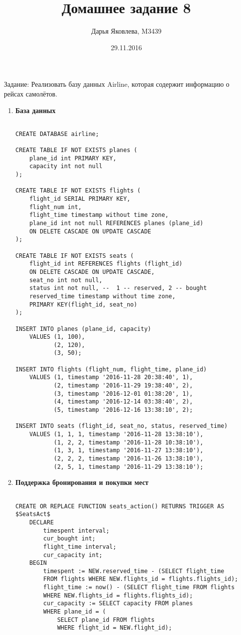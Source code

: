 \documentclass[12pt]{article}
\title{Домашнее задание 8}
\author{Дарья Яковлева, M3439}
\date{29.11.2016}
\begin{document}
\maketitle
\thispagestyle{empty}

Задание: Реализовать базу данных Airline, которая содержит информацию о рейсах самолётов.

\begin{enumerate}	
 \item \textbf{База данных}
 
\begin{lstlisting}     

CREATE DATABASE airline;

CREATE TABLE IF NOT EXISTS planes (
	plane_id int PRIMARY KEY,
	capacity int not null
);

CREATE TABLE IF NOT EXISTS flights (
	flight_id SERIAL PRIMARY KEY,
	flight_num int,
	flight_time timestamp without time zone,
	plane_id int not null REFERENCES planes (plane_id) 
	ON DELETE CASCADE ON UPDATE CASCADE
);

CREATE TABLE IF NOT EXISTS seats (
	flight_id int REFERENCES flights (flight_id) 
	ON DELETE CASCADE ON UPDATE CASCADE,
	seat_no int not null,
	status int not null, --  1 -- reserved, 2 -- bought
	reserved_time timestamp without time zone,
	PRIMARY KEY(flight_id, seat_no)
);

INSERT INTO planes (plane_id, capacity)
	VALUES (1, 100),
		   (2, 120),
		   (3, 50);

INSERT INTO flights (flight_num, flight_time, plane_id)
	VALUES (1, timestamp '2016-11-28 20:38:40', 1),
		   (2, timestamp '2016-11-29 19:38:40', 2),
		   (3, timestamp '2016-12-01 01:38:20', 1),
		   (4, timestamp '2016-12-14 03:38:40', 2),
		   (5, timestamp '2016-12-16 13:38:10', 2);

INSERT INTO seats (flight_id, seat_no, status, reserved_time)
	VALUES (1, 1, 1, timestamp '2016-11-28 13:38:10'),
		   (1, 2, 2, timestamp '2016-11-28 10:38:10'),
		   (1, 3, 1, timestamp '2016-11-27 13:38:10'),
		   (2, 2, 2, timestamp '2016-11-26 13:38:10'),
		   (2, 5, 1, timestamp '2016-11-29 13:38:10');
\end{lstlisting}     

     \item \textbf{Поддержка бронирования и покупки мест}

\begin{lstlisting} 

CREATE OR REPLACE FUNCTION seats_action() RETURNS TRIGGER AS $SeatsAct$
	DECLARE
		timespent interval;
		cur_bought int;
		flight_time interval;
		cur_capacity int;		
    BEGIN
    	timespent := NEW.reserved_time - (SELECT flight_time 
    	FROM flights WHERE NEW.flights_id = flights.flights_id);
    	flight_time := now() - (SELECT flight_time FROM flights 
    	WHERE NEW.flights_id = flights.flights_id);
    	cur_capacity := SELECT capacity FROM planes 
    	WHERE plane_id = (
	    	SELECT plane_id FROM flights 
	    	WHERE flight_id = NEW.flight_id);


\end{lstlisting}
\end{enumerate}
\end{document}
